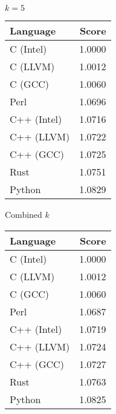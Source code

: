 \begin{subtable}{0.33\textwidth}
    \centering
    \caption{$k=5$}
    \label{table:energy:regexp(5)}
    \begin{tabular}{|l|r|}
        \hline
        Language & Score \\
        \hline
        C (Intel) & 1.0000 \\
        C (LLVM) & 1.0012 \\
        C (GCC) & 1.0060 \\
        Perl & 1.0696 \\
        C++ (Intel) & 1.0716 \\
        C++ (LLVM) & 1.0722 \\
        C++ (GCC) & 1.0725 \\
        Rust & 1.0751 \\
        Python & 1.0829 \\
        \hline
    \end{tabular}
\end{subtable}%
\begin{subtable}{0.33\textwidth}
    \centering
    \caption{Combined $k$}
    \label{table:energy:regexp:combined}
    \begin{tabular}{|l|r|}
        \hline
        Language & Score \\
        \hline
        C (Intel) & 1.0000 \\
        C (LLVM) & 1.0012 \\
        C (GCC) & 1.0060 \\
        Perl & 1.0687 \\
        C++ (Intel) & 1.0719 \\
        C++ (LLVM) & 1.0724 \\
        C++ (GCC) & 1.0727 \\
        Rust & 1.0763 \\
        Python & 1.0825 \\
        \hline
    \end{tabular}
\end{subtable}